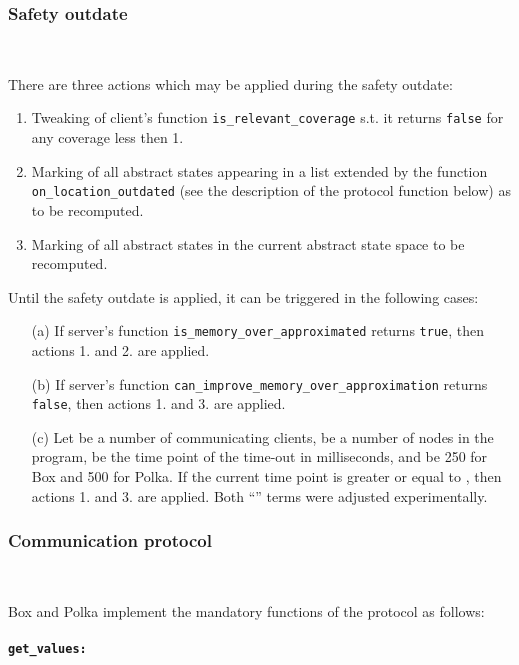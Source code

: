 \documentclass[envcountsame]{llncs}
\begin{document}
\subsubsection{Safety outdate}~\\
\label{sec:SafetyOutdateBoxPolka}

\noindent
There are three actions which may be applied during the safety outdate:
\begin{enumerate}
\item Tweaking of client's function \texttt{is\_relevant\_coverage} s.t. it
returns \texttt{false} for any coverage less then 1. \item Marking of all abstract states appearing in a list extended by the
function \texttt{on\_location\_outdated} (see the description of the protocol
function below) as to be recomputed. \item Marking of all abstract states in the current abstract state space to be
recomputed.
\end{enumerate}
Until the safety outdate is applied, it can be triggered in the following cases:
\begin{enumerate}
\item[(a)] If server's function \texttt{is\_memory\_over\_approximated} returns
\texttt{true}, then actions 1. and 2. are applied. \item[(b)] If server's function
\texttt{can\_improve\_memory\_over\_approximation} returns \texttt{false}, then
actions 1. and 3. are applied. \item[(c)] Let  be a number of communicating clients,  be a number of
nodes in the program,  be the time point of the time-out in milliseconds,
and  be 250 for Box and 500 for Polka. If the current time point is greater
or equal to , then actions 1. and 3. are
applied. Both ``'' terms were adjusted experimentally.
\end{enumerate}


\subsubsection{Communication protocol}~\\
\label{sec:CommunicationBoxPolka}

Box and Polka implement the mandatory functions of the protocol as follows:

\paragraph{\tt get\_values: }
\end{document}
